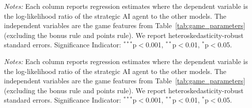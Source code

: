 \documentclass[11pt]{article}
\theoremstyle{definition}
\newcommand{\starlanguage}{Significance Indicator: $^{***}$p$<$0.001, $^{**}$p$<$0.01, $^{*}$p$<$0.05.}
\newcommand{\aisub}{AI agent}
\begin{document}
\begin{table}[h!] 
\begin{center}
\begin{minipage}{1 \linewidth}                          
\caption{Log-likelihood ratio regressions across game types ($\varepsilon = 0.2$)}  
\label{tab:game_level_eps_02}     
\centering                                            
\scriptsize
\renewcommand{\arraystretch}{1.2}

\end{minipage}
\end{center}
\begin{footnotesize}
\begin{singlespace}
\vspace*{-0.15in}
\emph{Notes:} Each column reports regression estimates where the dependent variable is the log-likelihood ratio of the strategic \aisub{} to the other models.
The independent variables are the game features from Table~\ref{tab:game_parameters} (excluding the bonus rule and points rule).
We report heteroskedasticity-robust standard errors.
\starlanguage{}
\end{singlespace}
\end{footnotesize}
\end{table}

\begin{table}[h!] 
\begin{center}
\begin{minipage}{1 \linewidth}                          
\caption{Log-likelihood ratio regressions across game types ($\varepsilon = 0.3$)}  
\label{tab:game_level_eps_03}     
\centering                                           
\scriptsize
\renewcommand{\arraystretch}{1.2}

\end{minipage}
\end{center}
\begin{footnotesize}
\begin{singlespace}
\vspace*{-0.15in}
\emph{Notes:} Each column reports regression estimates where the dependent variable is the log-likelihood ratio of the strategic \aisub{} to the other models.
The independent variables are the game features from Table~\ref{tab:game_parameters} (excluding the bonus rule and points rule).
We report heteroskedasticity-robust standard errors.
\starlanguage{}
\end{singlespace}
\end{footnotesize}
\end{table}
\end{document}
